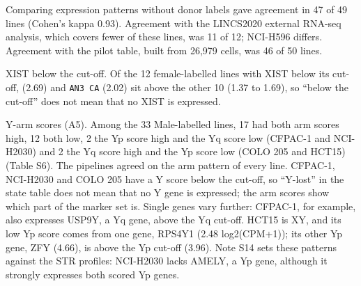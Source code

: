 \documentclass[
  11pt,
  letterpaper,
]{article}
\begin{document}
Comparing expression patterns without donor labels gave agreement in 47
of 49 lines (Cohen's kappa 0.93). Agreement with the LINCS2020 external
RNA-seq analysis, which covers fewer of these lines, was 11 of 12;
NCI-H596 differs. Agreement with the pilot table, built from 26,979
cells, was 46 of 50 lines.

XIST below the cut-off. Of the 12 female-labelled lines with XIST below
its cut-off,  (2.69) and \texttt{AN3\ CA} (2.02) sit
above the other 10 (1.37 to 1.69), so ``below the cut-off'' does not
mean that no XIST is expressed.

Y-arm scores (A5). Among the 33 Male-labelled lines, 17 had both arm
scores high, 12 both low, 2 the Yp score high and the Yq score low
(CFPAC-1 and NCI-H2030) and 2 the Yq score high and the Yp score low
(COLO 205 and HCT15) (Table S6). The pipelines agreed on the arm pattern
of every line. CFPAC-1, NCI-H2030 and COLO 205 have a Y score below the
cut-off, so ``Y-lost'' in the state table does not mean that no Y gene
is expressed; the arm scores show which part of the marker set is.
Single genes vary further: CFPAC-1, for example, also expresses USP9Y, a
Yq gene, above the Yq cut-off. HCT15 is XY, and its low Yp score comes
from one gene, RPS4Y1 (2.48 log2(CPM+1)); its other Yp gene, ZFY (4.66),
is above the Yp cut-off (3.96). Note S14 sets these patterns against the
STR profiles: NCI-H2030 lacks AMELY, a Yp gene, although it strongly
expresses both scored Yp genes.
\end{document}
